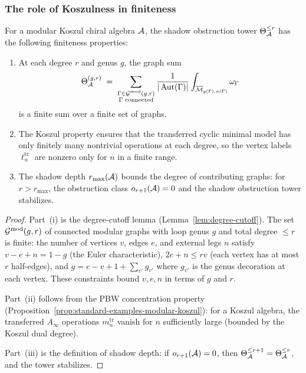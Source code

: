 \subsubsection{The role of Koszulness in finiteness}

\begin{proposition}
\label{prop:thqg-I-koszulness-finiteness}
For a modular Koszul chiral algebra $\mathcal{A}$, the shadow obstruction tower $\Theta_{\mathcal{A}}^{\leq r}$ has the following finiteness properties:
\begin{enumerate}[label=\textup{(\roman*)}]
\item At each degree $r$ and genus $g$, the graph sum
 \begin{equation}\label{eq:thqg-I-graph-sum-finite}
 \Theta_{\mathcal{A}}^{(g,r)} \;=\; \sum_{\substack{\Gamma \in \mathcal{G}^{\mathrm{mod}}(g,r) \\ \Gamma \text{ connected}}} \frac{1}{|\operatorname{Aut}(\Gamma)|} \int_{\overline{\mathcal{M}}_{g(\Gamma),n(\Gamma)}} \omega_\Gamma
 \end{equation}
 is a finite sum over a finite set of graphs.
\item The Koszul property ensures that the transferred cyclic minimal model has only finitely many nontrivial operations at each degree, so the vertex labels $\ell_n^{\mathrm{tr}}$ are nonzero only for $n$ in a finite range.
\item The shadow depth $r_{\max}(\mathcal{A})$ bounds the degree of contributing graphs: for $r > r_{\max}$, the obstruction class $o_{r+1}(\mathcal{A}) = 0$ and the shadow obstruction tower stabilizes.
\end{enumerate}
\end{proposition}

\begin{proof}
Part~(i) is the degree-cutoff lemma (Lemma~\ref{lem:degree-cutoff}). The set $\mathcal{G}^{\mathrm{mod}}(g,r)$ of connected modular graphs with loop genus $g$ and total degree $\leq r$ is finite: the number of vertices $v$, edges $e$, and external legs $n$ satisfy $v - e + n = 1 - g$ (the Euler characteristic), $2e + n \leq rv$ (each vertex has at most $r$ half-edges), and $g = e - v + 1 + \sum_{v'} g_{v'}$ where $g_{v'}$ is the genus decoration at each vertex. These constraints bound $v, e, n$ in terms of $g$ and $r$.

Part~(ii) follows from the PBW concentration property (Proposition~\ref{prop:standard-examples-modular-koszul}): for a Koszul algebra, the transferred $A_\infty$ operations $m_n^{\mathrm{tr}}$ vanish for $n$ sufficiently large (bounded by the Koszul dual degree).

Part~(iii) is the definition of shadow depth: if $o_{r+1}(\mathcal{A}) = 0$, then $\Theta_{\mathcal{A}}^{\leq r+1} = \Theta_{\mathcal{A}}^{\leq r}$, and the tower stabilizes.
\end{proof}

